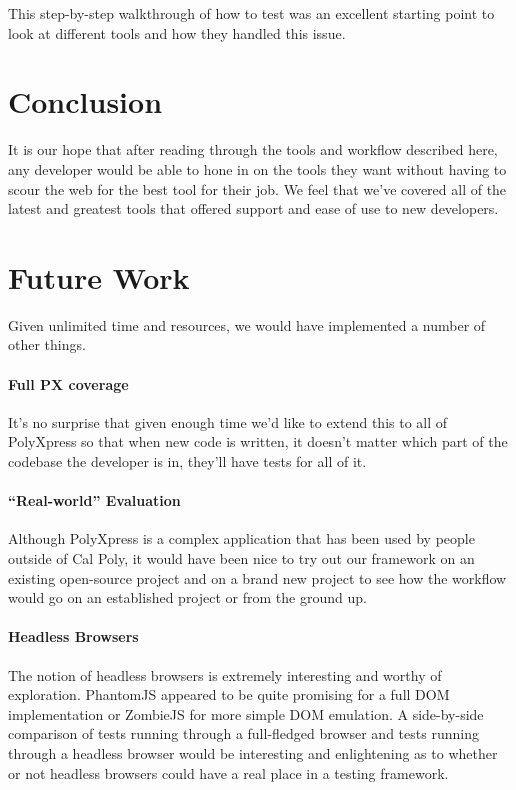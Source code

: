 \documentclass[12pt]{ucthesis}
\begin{document}
This step-by-step walkthrough of how to test was an excellent starting point to look at different tools and how they handled this issue.

\chapter{Conclusion}
It is our hope that after reading through the tools and workflow described here, any developer would be able to hone in on the tools they want without having to scour the web for the best tool for their job. We feel that we've covered all of the latest and greatest tools that offered support and ease of use to new developers.

\chapter{Future Work}
Given unlimited time and resources, we would have implemented a number of other things.

\subsubsection{Full PX coverage}
It's no surprise that given enough time we'd like to extend this to all of PolyXpress so that when new code is written, it doesn't matter which part of the codebase the developer is in, they'll have tests for all of it.

\subsubsection{``Real-world'' Evaluation}
Although PolyXpress is a complex application that has been used by people outside of Cal Poly, it would have been nice to try out our framework on an existing open-source project and on a brand new project to see how the workflow would go on an established project or from the ground up.

\subsubsection{Headless Browsers}
The notion of headless browsers is extremely interesting and worthy of exploration. PhantomJS appeared to be quite promising for a full DOM implementation or ZombieJS for more simple DOM emulation. A side-by-side comparison of tests running through a full-fledged browser and tests running through a headless browser would be interesting and enlightening as to whether or not headless browsers could have a real place in a testing framework.
\end{document}
